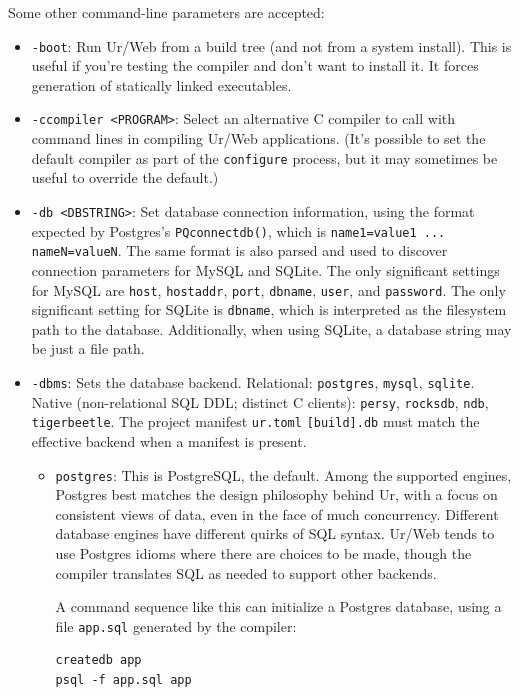 \documentclass{article}
\begin{document}
Some other command-line parameters are accepted:
\begin{itemize}
\item \texttt{-boot}: Run Ur/Web from a build tree (and not from a system install).  This is useful if you're testing the compiler and don't want to install it.  It forces generation of statically linked executables.

\item \texttt{-ccompiler <PROGRAM>}: Select an alternative C compiler to call with command lines in compiling Ur/Web applications.  (It's possible to set the default compiler as part of the \texttt{configure} process, but it may sometimes be useful to override the default.)

\item \texttt{-db <DBSTRING>}: Set database connection information, using the format expected by Postgres's \texttt{PQconnectdb()}, which is \texttt{name1=value1 ... nameN=valueN}.  The same format is also parsed and used to discover connection parameters for MySQL and SQLite.  The only significant settings for MySQL are \texttt{host}, \texttt{hostaddr}, \texttt{port}, \texttt{dbname}, \texttt{user}, and \texttt{password}.  The only significant setting for SQLite is \texttt{dbname}, which is interpreted as the filesystem path to the database.  Additionally, when using SQLite, a database string may be just a file path.

\item \texttt{-dbms}: Sets the database backend. Relational: \texttt{postgres}, \texttt{mysql}, \texttt{sqlite}. Native (non-relational SQL DDL; distinct C clients): \texttt{persy}, \texttt{rocksdb}, \texttt{ndb}, \texttt{tigerbeetle}. The project manifest \texttt{ur.toml} \texttt{[build].db} must match the effective backend when a manifest is present.
  \begin{itemize}
  \item \texttt{postgres}: This is PostgreSQL, the default.  Among the supported engines, Postgres best matches the design philosophy behind Ur, with a focus on consistent views of data, even in the face of much concurrency.  Different database engines have different quirks of SQL syntax.  Ur/Web tends to use Postgres idioms where there are choices to be made, though the compiler translates SQL as needed to support other backends.

    A command sequence like this can initialize a Postgres database, using a file \texttt{app.sql} generated by the compiler:
    \begin{verbatim}
createdb app
psql -f app.sql app
    \end{verbatim}


\end{itemize}
\end{itemize}
\end{document}
